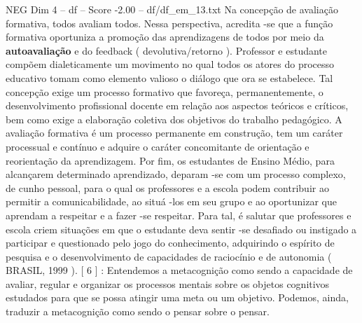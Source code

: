 \begin{textsample}{NEG Dim 4 – df – Score -2.00 – df/df\_em\_13.txt}
Na concepção de avaliação formativa, todos avaliam todos.
Nessa perspectiva, acredita -se que a função formativa oportuniza a promoção das aprendizagens de todos por meio da \textbf{autoavaliação} e do feedback ( devolutiva/retorno ).
Professor e estudante compõem dialeticamente um movimento no qual todos os atores do processo educativo tomam como elemento valioso o diálogo que ora se estabelece.
Tal concepção exige um processo formativo que favoreça, permanentemente, o desenvolvimento profissional docente em relação aos aspectos teóricos e críticos, bem como exige a elaboração coletiva dos objetivos do trabalho pedagógico.
A avaliação formativa é um processo permanente em construção, tem um caráter processual e contínuo e adquire o caráter concomitante de orientação e reorientação da aprendizagem.
Por fim, os estudantes de Ensino Médio, para alcançarem determinado aprendizado, deparam -se com um processo complexo, de cunho pessoal, para o qual os professores e a escola podem contribuir ao permitir a comunicabilidade, ao situá -los em seu grupo e ao oportunizar que aprendam a respeitar e a fazer -se respeitar.
Para tal, é salutar que professores e escola criem situações em que o estudante deva sentir -se desafiado ou instigado a participar e questionado pelo jogo do conhecimento, adquirindo o espírito de pesquisa e o desenvolvimento de capacidades de raciocínio e de autonomia ( BRASIL, 1999 ). [ 6 ] : Entendemos a metacognição como sendo a capacidade de avaliar, regular e organizar os processos mentais sobre os objetos cognitivos estudados para que se possa atingir uma meta ou um objetivo.
Podemos, ainda, traduzir a metacognição como sendo o pensar sobre o pensar.

\end{textsample}
